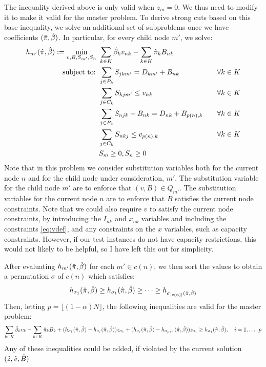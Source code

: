 \documentclass[10pt]{article}
\newcommand{\ka}{k} %
\newcommand{\KA}{K}
\newcommand{\jey}{j} %
\newcommand{\Bi}{B} %
\newcommand{\Vi}{v} %
\newcommand{\Es}{S} %
\newcommand{\Zed}{z} %
\newcommand{\x}{x} %
\begin{document}
The inequality derived above is only valid when $\Zed_m = 0$. We thus need to modify it to make it valid for the master problem.
To derive strong cuts based on this base inequality, we solve an additional set of subproblems once we have coefficients $(\hat{\pi},\hat{\beta})$. In particular, for every child node $m'$, we solve:
\begin{align*}
h_{m'}(\pisol,\betasol) := \min_{v,B,\Es_{m'},\Es_n} \ & \sum_{\ka  \in \KA} \betasol_k \Vi_{n \ka} - \sum_{\ka  \in \KA} \pisol_k \Bi_{n  \ka} \\
\text{subject to: } &  \sum_{j \in P_k} \Es_{jkm'} = D_{km'} + \Bi_{n  \ka} \ &\forall \ka  \in \KA  \\
    &\sum_{j \in C_k} \Es_{kjm'} \leq \Vi_{n \ka} \ &\forall \ka  \in \KA \\
    & \sum_{j\in P_{k}} {S}_{n \jey \ka} + \Bi_{n  \ka}  = D_{n \ka} + \Bi_{p(n), \ka} \quad &\forall \ka  \in \KA \\
    & \sum_{j\in C_{k}} {S}_{n \ka \jey} \leq \Vi_{p(n), \ka}  \quad &\forall \ka  \in \KA\\
    & \Es_m \geq 0, \Es_n \geq 0
\end{align*}
Note that in this problem we consider substitution variables both for the current node $n$ and for the child node under consideration, $m'$. The substitution variable for the child node $m'$ are to enforce that $(v,B) \in Q_{m'}$. The substitution variables for the current node $n$ are to enforce that $B$ satisfies the current node constraints. Note that we could also require $v$ to satisfy the current node constraints, by introducing the $I_{n \ka}$ and $\x_{n \ka}$ variables and including the constraints \eqref{eq:vdef}, and any constraints on the $x$ variables, such as capacity constraints. However, if our test instances do not have capacity restrictions, this would not likely to be helpful, so I have left this out for simplicity.

After evaluating $h_{m'}(\hat{\pi},\hat{\beta})$ for each $m' \in c(n)$, we then sort the values to obtain a permutation $\sigma$ of $c(n)$ which satisfies:
\[ h_{\sigma_1}(\hat{\pi},\hat{\beta}) \geq h_{\sigma_1}(\hat{\pi},\hat{\beta})  \geq \cdots \geq h_{\sigma_{|c(n)|}(\hat{\pi},\hat{\beta})}
 \]
Then, letting $p = \lfloor (1-\alpha) N \rfloor$, the following inequalities are valid for the master problem:
\[ \sum_{\ka  \in \KA} \betasol_k \Vi_k - \sum_{\ka  \in \KA} \pisol_k \Bi_k + 
(h_{\sigma_1}(\pisol,\betasol) - h_{\sigma_i}(\pisol,\betasol))\Zed_{\sigma_1} + 
(h_{\sigma_i}(\pisol,\betasol) - h_{\sigma_{p+1}}(\pisol,\betasol))\Zed_{\sigma_i} \geq h_{\sigma_1}(\pisol,\betasol), \quad i=1,\ldots, p \]
Any of these inequalities could be added, if violated by the current solution $(\zsol,\vsol,\bsol)$.
\end{document}
